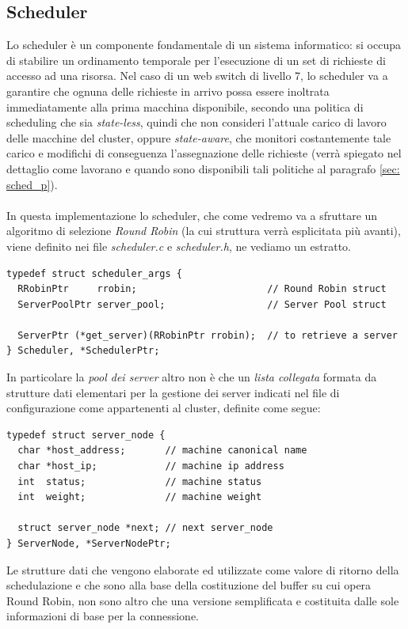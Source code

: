 \documentclass[italian]{tktltiki2}
\begin{document}
\subsection{Scheduler}
\label{ssec: sched}
Lo scheduler è un componente fondamentale di un sistema informatico: si occupa di stabilire un ordinamento temporale per l'esecuzione di un set di richieste di accesso ad una risorsa. Nel caso di un web switch di livello 7, lo scheduler va a garantire che ognuna delle richieste in arrivo possa essere inoltrata immediatamente alla prima macchina disponibile, secondo una politica di scheduling che sia \emph{state-less}, quindi che non consideri l'attuale carico di lavoro delle macchine del cluster, oppure \emph{state-aware}, che monitori costantemente tale carico e modifichi di conseguenza l'assegnazione delle richieste (verrà spiegato nel dettaglio come lavorano e quando sono disponibili tali politiche al paragrafo \ref{sec: sched_p}). \\\\
In questa implementazione lo scheduler, che come vedremo va a sfruttare un algoritmo di selezione \emph{Round Robin} (la cui struttura verrà esplicitata più avanti), viene definito nei file \emph{scheduler.c} e \emph{scheduler.h}, ne vediamo un estratto.
\begin{lstlisting}
typedef struct scheduler_args {
  RRobinPtr     rrobin;                       // Round Robin struct
  ServerPoolPtr server_pool;                  // Server Pool struct

  ServerPtr (*get_server)(RRobinPtr rrobin);  // to retrieve a server
} Scheduler, *SchedulerPtr;
\end{lstlisting}
In particolare la \emph{pool dei server} altro non è che un \emph{lista collegata} formata da strutture dati elementari per la gestione dei server indicati nel file di configurazione come appartenenti al cluster, definite come segue:
\begin{lstlisting}
typedef struct server_node {
  char *host_address;       // machine canonical name
  char *host_ip;            // machine ip address
  int  status;              // machine status
  int  weight;              // machine weight

  struct server_node *next; // next server_node
} ServerNode, *ServerNodePtr;
\end{lstlisting}
Le strutture dati che vengono elaborate ed utilizzate come valore di ritorno della schedulazione e che sono alla base della costituzione del buffer su cui opera Round Robin, non sono altro che una versione semplificata e costituita dalle sole informazioni di base per la connessione. \\
\end{document}
